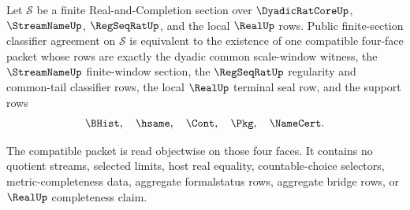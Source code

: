\begin{theorem}
\label{thm:real-l10-finite-section-classifier-equivalence}
Let $\mathcal S$ be a finite Real-and-Completion section over $\DyadicRatCoreUp$, $\StreamNameUp$, $\RegSeqRatUp$, and the local $\RealUp$ rows. Public finite-section classifier agreement on $\mathcal S$ is equivalent to the existence of one compatible four-face packet whose rows are exactly the dyadic common scale-window witness, the $\StreamNameUp$ finite-window section, the $\RegSeqRatUp$ regularity and common-tail classifier rows, the local $\RealUp$ terminal seal row, and the support rows
$$
\BHist,\quad \hsame,\quad \Cont,\quad \Pkg,\quad \NameCert.
$$

The compatible packet is read objectwise on those four faces. It contains no quotient streams, selected limits, host real equality, countable-choice selectors, metric-completeness data, aggregate formalstatus rows, aggregate bridge rows, or $\RealUp$ completeness claim.
\end{theorem}
